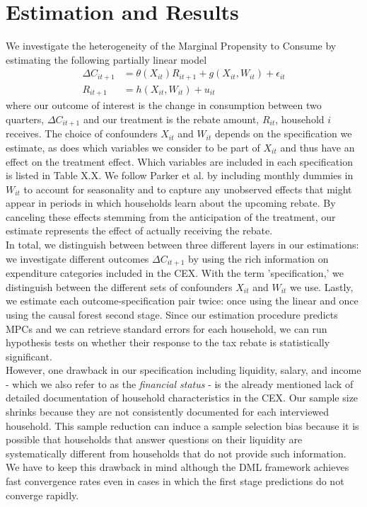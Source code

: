 \section{Estimation and Results} \label{sec:estim_res}
We investigate the heterogeneity of the Marginal Propensity to Consume by estimating the following partially linear model
\begin{align}
    \Delta C_{it+1}&=\theta(X_{it})R_{it+1}+g(X_{it}, W_{it})+\epsilon_{it} \label{eq:plm_C1}\\
    R_{it+1}&=h(X_{it}, W_{it})+u_{it} \label{eq:plm_C2}
\end{align}
where our outcome of interest is the change in consumption between two quarters, $\Delta C_{it+1}$ and our treatment is the rebate amount, $R_{
it}$, household $i$ receives. The choice of confounders $X_{it}$ and $W_{it}$ depends on the specification we estimate, as does which variables we consider to be part of $X_{it}$ and thus have an effect on the treatment effect. Which variables are included in each specification is listed in Table X.X. We follow Parker et al. by including monthly dummies in $W_{it}$ to account for seasonality and to capture any unobserved effects that might appear in periods in which households learn about the upcoming rebate. By canceling these effects stemming from the anticipation of the treatment, our estimate represents the effect of actually receiving the rebate. \\ 
In total, we distinguish between between three different layers in our estimations: we investigate different outcomes $\Delta C_{it+1}$ by using the rich information on expenditure categories included in the CEX. With the term 'specification,' we distinguish between the different sets of confounders $X_{it}$ and $W_{it}$ we use. Lastly, we estimate each outcome-specification pair twice: once using the linear and once using the causal forest second stage. Since our estimation procedure predicts MPCs and we can retrieve standard errors for each household, we can run hypothesis tests on whether their response to the tax rebate is statistically significant. \\
However, one drawback in our specification including liquidity, salary, and income - which we also refer to as the \textit{financial status} - is the already mentioned lack of detailed documentation of household characteristics in the CEX. Our sample size shrinks because they are not consistently documented for each interviewed household. This sample reduction can induce a sample selection bias because it is possible that households that answer questions on their liquidity are systematically different from households that do not provide such information. We have to keep this drawback in mind although the DML framework achieves fast convergence rates even in cases in which the first stage predictions do not converge rapidly.

